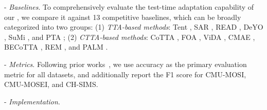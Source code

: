 \noindent - \textit{Baselines}. To comprehensively evaluate the test-time adaptation capability of our \M, we compare it against 13 competitive baselines, which can be broadly categorized into two groups: (1) \textit{TTA-based methods}: Tent \cite{Wang2021Tent}, SAR \cite{Niu2023Stable}, READ \cite{yang2024test}, DeYO \cite{Lee2024Entropy}, SuMi \cite{Guo2025Smoothing}, and PTA \cite{wangpartition}; (2) \textit{CTTA-based methods}: CoTTA \cite{wang2022continual}, FOA \cite{Niu2024FOA}, ViDA \cite{Liu2024ViDA}, CMAE \cite{liu2024continual}, BECoTTA \cite{Lee2024BECoTTA}, REM \cite{Han2025Ranked}, and PALM \cite{maharana2025palm}.

\noindent - \textit{Metrics}. Following prior works~\cite{yang2024test, Guo2025Smoothing}, we use accuracy as the primary evaluation metric for all datasets, and additionally report the F1 score for CMU-MOSI, CMU-MOSEI, and CH-SIMS.


\noindent - \textit{Implementation}.



